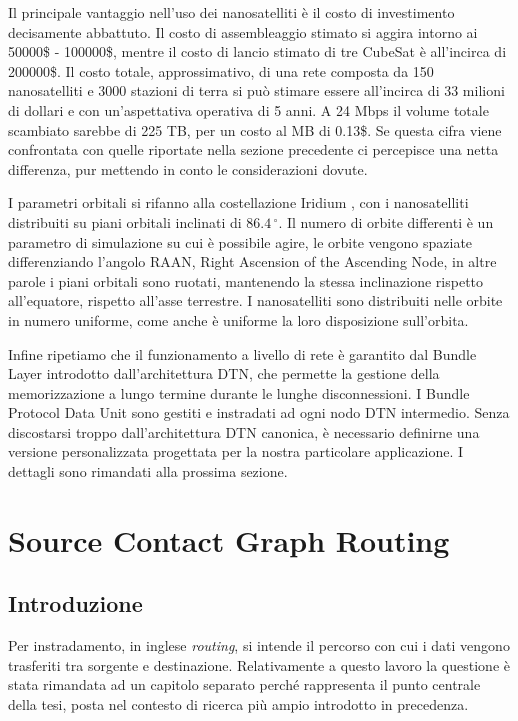 \documentclass[a4paper]{article}
\begin{document}
		Il principale vantaggio nell'uso dei nanosatelliti è il costo di investimento decisamente abbattuto. Il costo di assembleaggio stimato si aggira intorno ai 50000\$ - 100000\$, mentre il costo di lancio stimato di tre CubeSat è all'incirca di 200000\$. Il costo totale, approssimativo, di una rete composta da 150 nanosatelliti e 3000 stazioni di terra si può stimare essere all'incirca di 33 milioni di dollari e con un'aspettativa operativa di 5 anni. A 24 Mbps il volume totale scambiato sarebbe di 225 TB, per un costo al MB di 0.13\$. Se questa cifra viene confrontata con quelle riportate nella sezione precedente ci percepisce una netta differenza, pur mettendo in conto le considerazioni dovute. 
		
		I parametri orbitali si rifanno alla costellazione Iridium \cite{fossa1998overview}, con i nanosatelliti distribuiti su piani orbitali inclinati di $86.4\,^{\circ}$. Il numero di orbite differenti è un parametro di simulazione su cui è possibile agire, le orbite vengono spaziate differenziando l'angolo RAAN, Right Ascension of the Ascending Node, in altre parole i piani orbitali sono ruotati, mantenendo la stessa inclinazione rispetto all'equatore, rispetto all'asse terrestre. I nanosatelliti sono distribuiti nelle orbite in numero uniforme, come anche è uniforme la loro disposizione sull'orbita. 
		
		Infine ripetiamo che il funzionamento a livello di rete è garantito dal Bundle Layer introdotto dall'architettura DTN, che permette la gestione della memorizzazione a lungo termine durante le lunghe disconnessioni. I Bundle Protocol Data Unit sono gestiti e instradati ad ogni nodo DTN intermedio. Senza discostarsi troppo dall'architettura DTN canonica, è necessario definirne una versione personalizzata progettata per la nostra particolare applicazione. I dettagli sono rimandati alla prossima sezione. 
		
			
		
		
	\section{Source Contact Graph Routing}
	
		\subsection{Introduzione}
		Per instradamento, in inglese {\it routing}, si intende il percorso con cui i dati vengono trasferiti tra sorgente e destinazione. Relativamente a questo lavoro la questione è stata rimandata ad un capitolo separato perché rappresenta il punto centrale della tesi, posta nel contesto di ricerca più ampio introdotto in precedenza. 
		
\end{document}
